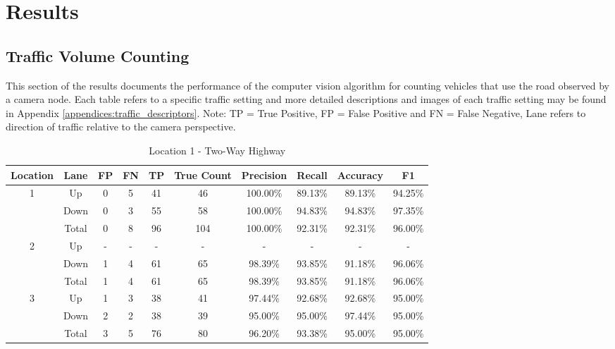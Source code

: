 \chapter{Results}

\section{Traffic Volume Counting}

This section of the results documents the performance of the computer vision algorithm for counting vehicles that use the road observed by a camera node. Each table refers to a specific traffic setting and more detailed descriptions and images of each traffic setting may be found in Appendix \ref{appendices:traffic_descriptors}. Note: TP = True Positive, FP = False Positive and FN = False Negative, Lane refers to direction of traffic relative to the camera perspective. 

\begin{table}
    \centering
    \begin{tabular}{|c|c|c|c|c|c|c|c|c|c|} 
    \hline
    \textbf{Location} & \textbf{Lane} & \textbf{FP} & \textbf{FN}& \textbf{TP}& \textbf{True Count}&\textbf{Precision}& \textbf{Recall}& \textbf{Accuracy} & \textbf{F1}\\
    \hline
    \multirow{3}{4em}{1}  
    &Up&0&5&41&46&100.00\%&89.13\%&89.13\%&94.25\%\\\cline{2-10}
    &Down&0&3&55&58&100.00\%&94.83\%&94.83\%&97.35\%\\\cline{2-10}
    &Total&0&8&96&104&100.00\%&92.31\%&92.31\%&96.00\%\\\hline\hline

    \multirow{3}{4em}{2}
    &Up&-&-&-&-&-&-&-&-\\\cline{2-10}
    &Down&1&4&61&65&98.39\%&93.85\%&91.18\%&96.06\%\\\cline{2-10}
    &Total&1&4&61&65&98.39\%&93.85\%&91.18\%&96.06\%\\\hline\hline

    \multirow{3}{4em}{3}
    &Up&1&3&38&41&97.44\%&92.68\%&92.68\%&95.00\%\\\cline{2-10}
    &Down&2&2&38&39&95.00\%&95.00\%&97.44\%&95.00\%\\\cline{2-10}
    &Total&3&5&76&80&96.20\%&93.38\%&95.00\%&95.00\%\\\hline\hline


    
\end{tabular}
\caption{Location 1 - Two-Way Highway}
\end{table}
\raggedbottom

